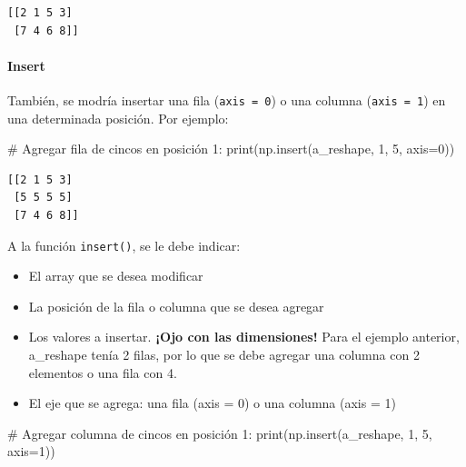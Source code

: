\documentclass[
  letterpaper,
  DIV=11,
  numbers=noendperiod]{scrreprt}
\let\oldparagraph\paragraph
\renewcommand{\paragraph}[1]{\oldparagraph{#1}\mbox{}}
\newenvironment{Shaded}{\begin{snugshade}}{\end{snugshade}}
\newcommand{\BuiltInTok}[1]{\textcolor[rgb]{0.00,0.23,0.31}{#1}}
\newcommand{\CommentTok}[1]{\textcolor[rgb]{0.37,0.37,0.37}{#1}}
\newcommand{\DecValTok}[1]{\textcolor[rgb]{0.68,0.00,0.00}{#1}}
\newcommand{\NormalTok}[1]{\textcolor[rgb]{0.00,0.23,0.31}{#1}}
\newcommand{\OperatorTok}[1]{\textcolor[rgb]{0.37,0.37,0.37}{#1}}
\providecommand{\tightlist}{%
  \setlength{\itemsep}{0pt}\setlength{\parskip}{0pt}}\usepackage{longtable,booktabs,array}
\begin{document}
\begin{verbatim}
[[2 1 5 3]
 [7 4 6 8]]
\end{verbatim}

\paragraph{Insert}\label{insert}

También, se modría insertar una fila (\texttt{axis\ =\ 0}) o una columna
(\texttt{axis\ =\ 1}) en una determinada posición. Por ejemplo:

\begin{Shaded}
\begin{Highlighting}[]
\CommentTok{\# Agregar fila de cincos en posición 1:}
\BuiltInTok{print}\NormalTok{(np.insert(a\_reshape, }\DecValTok{1}\NormalTok{, }\DecValTok{5}\NormalTok{, axis}\OperatorTok{=}\DecValTok{0}\NormalTok{))}
\end{Highlighting}
\end{Shaded}

\begin{verbatim}
[[2 1 5 3]
 [5 5 5 5]
 [7 4 6 8]]
\end{verbatim}

A la función \texttt{insert()}, se le debe indicar:\\

\begin{itemize}
\tightlist
\item
  El array que se desea modificar\\
\item
  La posición de la fila o columna que se desea agregar\\
\item
  Los valores a insertar. \textbf{¡Ojo con las dimensiones!} Para el
  ejemplo anterior, a\_reshape tenía 2 filas, por lo que se debe agregar
  una columna con 2 elementos o una fila con 4.\\
\item
  El eje que se agrega: una fila (axis = 0) o una columna (axis = 1)\\
\end{itemize}

\begin{Shaded}
\begin{Highlighting}[]
\CommentTok{\# Agregar columna de cincos en posición 1:}
\BuiltInTok{print}\NormalTok{(np.insert(a\_reshape, }\DecValTok{1}\NormalTok{, }\DecValTok{5}\NormalTok{, axis}\OperatorTok{=}\DecValTok{1}\NormalTok{))}
\end{Highlighting}
\end{Shaded}
\end{document}
